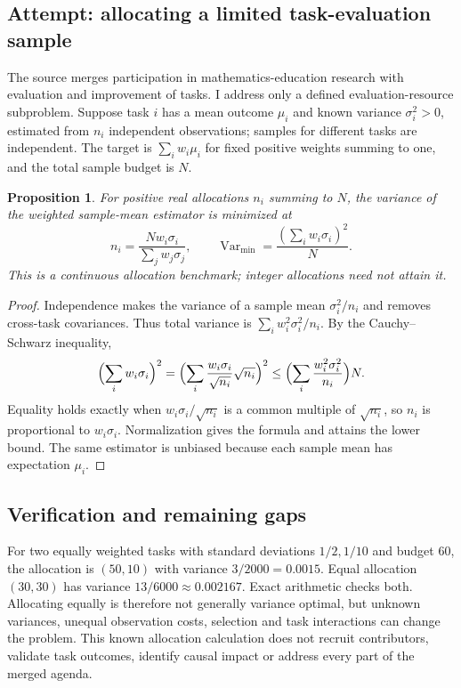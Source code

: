 \documentclass[11pt]{article}
\newtheorem{proposition}{Proposition}
\begin{document}
\subsection{Attempt: allocating a limited task-evaluation sample}
The source merges participation in mathematics-education research with evaluation and improvement of tasks. I address only a defined evaluation-resource subproblem. Suppose task $i$ has a mean outcome $\mu_i$ and known variance $\sigma_i^2>0$, estimated from $n_i$ independent observations; samples for different tasks are independent. The target is $\sum_iw_i\mu_i$ for fixed positive weights summing to one, and the total sample budget is $N$.
\begin{proposition}
For positive real allocations $n_i$ summing to $N$, the variance of the weighted sample-mean estimator is minimized at
\[
n_i=\frac{Nw_i\sigma_i}{\sum_jw_j\sigma_j},
\qquad
\operatorname{Var}_{\min}=\frac{(\sum_iw_i\sigma_i)^2}{N}.
\]
This is a continuous allocation benchmark; integer allocations need not attain it.
\end{proposition}
\begin{proof}
Independence makes the variance of a sample mean $\sigma_i^2/n_i$ and removes cross-task covariances. Thus total variance is $\sum_iw_i^2\sigma_i^2/n_i$. By the Cauchy--Schwarz inequality,
\[
\Bigl(\sum_iw_i\sigma_i\Bigr)^2
=\Bigl(\sum_i\frac{w_i\sigma_i}{\sqrt{n_i}}\sqrt{n_i}\Bigr)^2
\le\Bigl(\sum_i\frac{w_i^2\sigma_i^2}{n_i}\Bigr)N.
\]
Equality holds exactly when $w_i\sigma_i/\sqrt{n_i}$ is a common multiple of $\sqrt{n_i}$, so $n_i$ is proportional to $w_i\sigma_i$. Normalization gives the formula and attains the lower bound. The same estimator is unbiased because each sample mean has expectation $\mu_i$.
\end{proof}
\subsection{Verification and remaining gaps}
For two equally weighted tasks with standard deviations $1/2,1/10$ and budget 60, the allocation is $(50,10)$ with variance $3/2000=0.0015$. Equal allocation $(30,30)$ has variance $13/6000\approx0.002167$. Exact arithmetic checks both. Allocating equally is therefore not generally variance optimal, but unknown variances, unequal observation costs, selection and task interactions can change the problem. This known allocation calculation does not recruit contributors, validate task outcomes, identify causal impact or address every part of the merged agenda.
\end{document}
